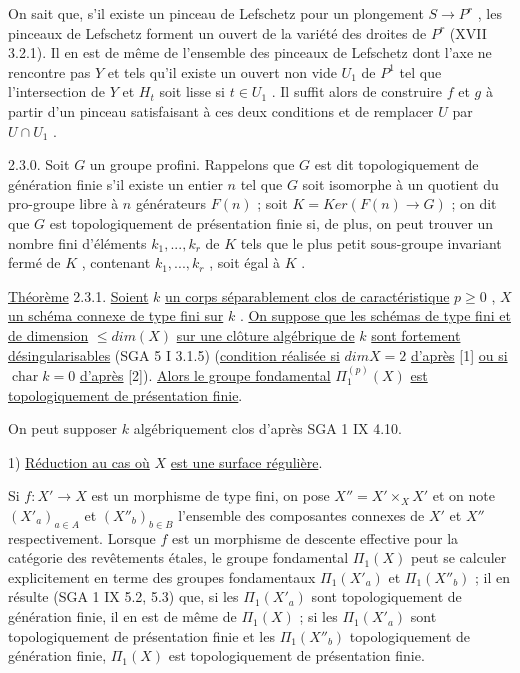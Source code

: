 On sait que, s'il existe un pinceau de Lefschetz pour un plongement $S \longrightarrow P^r$ , les pinceaux de Lefschetz forment un ouvert de la variété des droites de $P^r$ (XVII 3.2.1). Il en est de même de l'ensemble des pinceaux de Lefschetz dont l'axe ne rencontre pas $Y$ et tels qu'il existe un ouvert non vide $U_1$ de $P^1$ tel que l'intersection de $Y$ et $H_t$ soit lisse si $t \in U_1$ . Il suffit alors de construire $f$ et $g$ à partir d'un pinceau satisfaisant à ces deux conditions et de remplacer $U$ par $U \cap U_1$ .

2.3.0. Soit $G$ un groupe profini. Rappelons que $G$ est dit topologiquement de génération finie s'il existe un entier $n$ tel que $G$ soit isomorphe à un quotient du pro-groupe libre à $n$ générateurs $F(n)$ ; soit $K = Ker(F(n) \longrightarrow G)$ ; on dit que $G$ est topologiquement de présentation finie si, de plus, on peut trouver un nombre fini d'éléments $k_1,...,k_r$ de $K$ tels que le plus petit sous-groupe invariant fermé de $K$ , contenant $k_1,...,k_r$ , soit égal à $K$ .

\underline{Théorème} 2.3.1. \underline{Soient} $k$ \underline{un corps séparablement clos de caractéristique} $p \geqslant 0$ , $X$ \underline{un schéma connexe de type fini sur} $k$ . \underline{On suppose que les schémas de type fini et de dimension} $\leqslant dim(X)$ \underline{sur une clôture algébrique de} $k$ \underline{sont fortement désingularisables} (SGA 5 I 3.1.5) (\underline{condition réalisée si} $dim X = 2$ \underline{d'après} [1] \underline{ou si} $\operatorname{char}k = 0$ \underline{d'après} [2]). \underline{Alors le groupe fondamental} $\Pi_1^{(p)}(X)$ \underline{est topologiquement de présentation finie}.

On peut supposer $k$ algébriquement clos d'après SGA 1 IX 4.10.


1) \underline{Réduction au cas où} $X$ \underline{est une surface régulière}.

Si $f : X' \longrightarrow X$ est un morphisme de type fini, on pose $X'' = X'\times_X X'$ et on note $(X'_a)_{a \in A}$ et $(X''_b)_{b \in B}$ l'ensemble des composantes connexes de $X'$ et $X''$ respectivement. Lorsque $f$ est un morphisme de descente effective pour la catégorie des revêtements étales, le groupe fondamental $\Pi_1(X)$ peut se calculer explicitement
en terme des groupes fondamentaux $\Pi_1(X'_a)$ et $\Pi_1(X''_b)$ ; il en résulte (SGA 1 IX 5.2, 5.3) que, si les $\Pi_1(X'_a)$ sont topologiquement de génération finie, il en est de même de $\Pi_1(X)$ ; si les $\Pi_1(X'_a)$ sont topologiquement de présentation finie et les $\Pi_1(X''_b)$ topologiquement de génération finie, $\Pi_1(X)$ est topologiquement de présentation finie.

